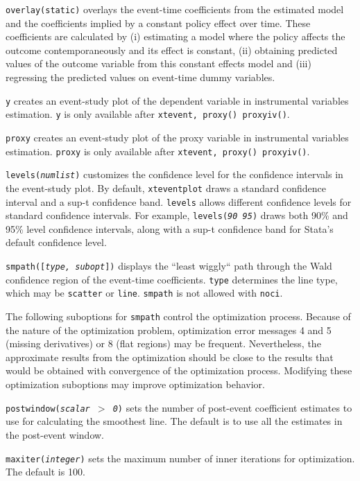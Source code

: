 \documentclass[12pt]{article}
\begin{document}
\morehangpara
\texttt{overlay(static)} overlays the event-time coefficients from the estimated model and the coefficients implied by a constant policy effect over time.
These coefficients are calculated by
(i) estimating a model where the policy affects the outcome contemporaneously and its effect is constant,
(ii) obtaining predicted values of the outcome variable from this constant effects model and
(iii) regressing the predicted values on event-time dummy variables.

\hangpara
\texttt{y} creates an event-study plot of the dependent variable in instrumental variables estimation.
\texttt{y} is only available after \texttt{xtevent, proxy() proxyiv()}.

\hangpara
\texttt{proxy} creates an event-study plot of the proxy variable in instrumental variables estimation.
\texttt{proxy} is only available after \texttt{xtevent, proxy() proxyiv()}.

\hangpara
\texttt{levels({\it numlist})} customizes the confidence level for the confidence intervals in the event-study plot.
By default, \texttt{xteventplot} draws a standard confidence interval and a sup-t confidence band.
\texttt{levels} allows different confidence levels for standard confidence intervals.
For example, \texttt{levels({\it 90 95})} draws both 90\% and 95\% level confidence intervals, along with a sup-t confidence band for Stata's default confidence level.

\hangpara
\texttt{smpath([{\it type, subopt}])} displays the ``least wiggly`` path through the Wald confidence region of the event-time coefficients.
\texttt{type} determines the line type, which may be \texttt{scatter} or \texttt{line}.
\texttt{smpath} is not allowed with \texttt{noci}.

\hangpara
The following suboptions for \texttt{smpath} control the optimization process. Because of the nature of the optimization problem, optimization error messages 4 and 5 (missing derivatives) or 8 (flat regions) may be frequent. Nevertheless, the approximate results from the optimization should be close to the results that would be obtained with convergence of the optimization process. Modifying these optimization suboptions may improve optimization behavior.

\morehangpara
\texttt{postwindow({\it scalar $>$ 0})} sets the number of post-event coefficient estimates to use for calculating the smoothest line.
The default is to use all the estimates in the post-event window.

\morehangpara
\texttt{maxiter({\it integer})} sets the maximum number of inner iterations for optimization.
The default is 100.
\end{document}
